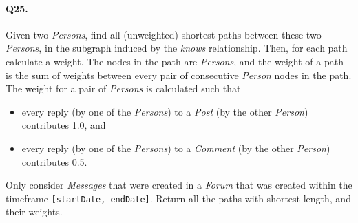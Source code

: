 \paragraph{Q25.}
Given two \emph{Persons}, find all (unweighted) shortest paths between
these two \emph{Persons}, in the subgraph induced by the \emph{knows}
relationship.
Then, for each path calculate a weight. The nodes in the path are
\emph{Persons}, and the weight of a path is the sum of weights between
every pair of consecutive \emph{Person} nodes in the path.
The weight for a pair of \emph{Persons} is calculated such that
\begin{itemize}
\tightlist
\item
  every reply (by one of the \emph{Persons}) to a \emph{Post} (by the
  other \emph{Person}) contributes 1.0, and
\item
  every reply (by one of the \emph{Persons}) to a \emph{Comment} (by the
  other \emph{Person}) contributes 0.5.
\end{itemize}
Only consider \emph{Messages} that were created in a \emph{Forum} that
was created within the timeframe \texttt{{[}startDate,\ endDate{]}}.
Return all the paths with shortest length, and their weights.
